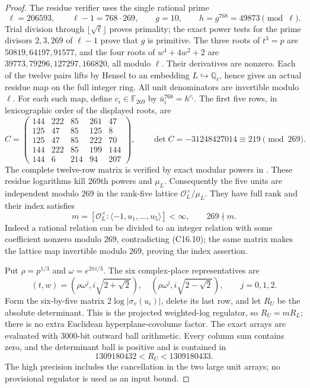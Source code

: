 \begin{proof}
The residue verifier uses the single rational prime
\[
 \ell=206593,\qquad \ell-1=768\cdot269,
 \qquad g=10,\qquad h=g^{768}=49873\pmod\ell.
 \tag{C16.9}
\]
Trial division through $\lfloor\sqrt\ell\rfloor$ proves primality;
the exact power tests for the prime divisors $2,3,269$ of
$\ell-1$ prove that $g$ is primitive.  The three roots of $t^3=p$
are $50819,64197,91577$, and the four roots of $w^4+4w^2+2$
are $39773,79296,127297,166820$, all modulo $\ell$.
Their derivatives are nonzero.  Each of the twelve pairs lifts
by Hensel to an embedding $L\hookrightarrow\mathbb Q_\ell$,
hence gives an actual residue map on the full integer ring.
All unit denominators are invertible modulo $\ell$.
For each such map, define $c_i\in\mathbb F_{269}$ by
$\bar u_i^{768}=h^{c_i}$.
The first five rows, in lexicographic order of the displayed roots, are
\[
 C=\begin{pmatrix}
144&222&85&261&47\\
125&47&85&125&8\\
125&47&85&222&70\\
144&222&85&199&144\\
144&6&214&94&207
\end{pmatrix},\qquad
 \det C=-31248427014\equiv219\pmod{269}.
 \tag{C16.10}
\]
The complete twelve-row matrix is verified by exact modular powers
in .
These residue logarithms kill $269$th powers and $\mu_L$.
Consequently the five units are independent modulo $269$ in the
rank-five lattice $\mathcal O_L^\times/\mu_L$.
They have full rank and their index satisfies
\[
 m=[\mathcal O_L^\times:\langle-1,u_1,\ldots,u_5\rangle]<\infty,
                         \qquad269\nmid m.
 \tag{C16.11}
\]
Indeed a rational relation can be divided to an integer relation
with some coefficient nonzero modulo $269$, contradicting
(C16.10); the same matrix makes the lattice map invertible
modulo $269$, proving the index assertion.

Put $\rho=p^{1/3}$ and $\omega=e^{2\pi i/3}$.
The six complex-place representatives are
\[
 (t,w)=(\rho\omega^j,i\sqrt{2+\sqrt2}),\quad
       (\rho\omega^j,i\sqrt{2-\sqrt2}),\qquad j=0,1,2.
 \tag{C16.12}
\]
Form the six-by-five matrix $2\log|\sigma_v(u_i)|$, delete
its last row, and let $R_U$ be the absolute determinant.
This is the projected weighted-log regulator, so $R_U=mR_L$;
there is no extra Euclidean hyperplane-covolume factor.
The exact arrays are evaluated with $3000$-bit outward ball
arithmetic.  Every column sum contains zero, and the determinant
ball is positive and is contained in
\[
                       1309180432<R_U<1309180433.
 \tag{C16.13}
\]
The high precision includes the cancellation in the two large
unit arrays; no provisional regulator is used as an input bound.


\end{proof}
